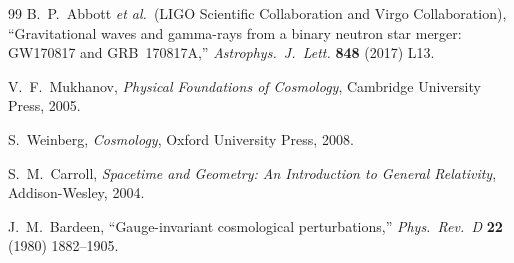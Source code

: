 \documentclass[12pt,a4paper]{article}
\theoremstyle{definition}
\theoremstyle{remark}
\begin{document}
\begin{thebibliography}{99}
B.~P.~Abbott \emph{et al.}\ (LIGO Scientific Collaboration and
Virgo Collaboration),
``Gravitational waves and gamma-rays from a binary neutron star
merger: GW170817 and GRB~170817A,''
\emph{Astrophys.\ J.\ Lett.} \textbf{848} (2017) L13.

V.~F.~Mukhanov,
\emph{Physical Foundations of Cosmology},
Cambridge University Press, 2005.

S.~Weinberg,
\emph{Cosmology},
Oxford University Press, 2008.

S.~M.~Carroll,
\emph{Spacetime and Geometry: An Introduction to General Relativity},
Addison-Wesley, 2004.

J.~M.~Bardeen,
``Gauge-invariant cosmological perturbations,''
\emph{Phys.\ Rev.\ D} \textbf{22} (1980) 1882--1905.

\end{thebibliography}
\end{document}
